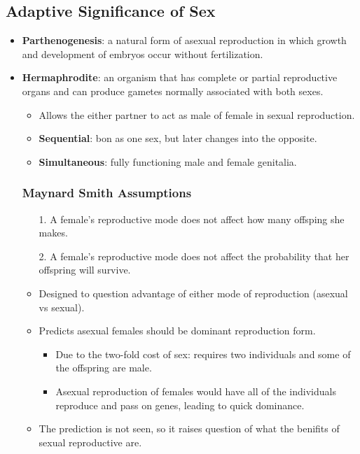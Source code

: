 \documentclass[12pt,a4paper]{article}
\begin{document}
\subsection{Adaptive Significance of Sex}
\begin{itemize}
    \item \textbf{Parthenogenesis}: a natural form of {\color{o-Sun}asexual reproduction} in which growth and development of embryos occur without fertilization.
    \item \textbf{Hermaphrodite}: an organism that has complete or partial reproductive organs and can produce gametes normally associated with both sexes.
        \begin{itemize}
            \item Allows the either partner to act as male of female in sexual reproduction.
            \item \textbf{Sequential}: bon as one sex, but later changes into the opposite.
            \item \textbf{Simultaneous}: fully functioning male and female genitalia.
        \end{itemize}
    \subsubsection{Maynard Smith Assumptions}
    \begin{itemize}
        \item[1.] A female's reproductive mode does not affect how many offsping she makes.
        \item[2.] A female's reproductive mode does not affect the probability that her offspring will survive.
        \item Designed to question advantage of either mode of reproduction (asexual vs sexual).
        \item Predicts asexual females should be dominant reproduction form.
            \begin{itemize}
                \item Due to the {\color{o-Sun}two-fold cost of sex}: requires two individuals and some of the offspring are male.
                \item Asexual reproduction of females would have all of the individuals reproduce and pass on genes, leading to quick dominance.
            \end{itemize}
        \item The prediction is not seen, so it raises question of what the benifits of sexual reproductive are.
    \end{itemize}

\end{itemize}
\end{document}
